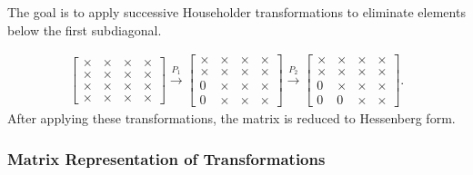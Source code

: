 \documentclass[12pt]{article}
\begin{document}
The goal is to apply successive Householder transformations to eliminate elements below the first subdiagonal.

\begin{align*}
\begin{bmatrix}
\times & \times & \times & \times \\
\times & \times & \times & \times \\
\times & \times & \times & \times \\
\times & \times & \times & \times
\end{bmatrix}
\xrightarrow{P_1}
\begin{bmatrix}
\times & \times & \times & \times \\
\times & \times & \times & \times \\
0 & \times & \times & \times \\
0 & \times & \times & \times
\end{bmatrix}
\xrightarrow{P_2}
\begin{bmatrix}
\times & \times & \times & \times \\
\times & \times & \times & \times \\
0 & \times & \times & \times \\
0 & 0 & \times & \times
\end{bmatrix}.
\end{align*}
After applying these transformations, the matrix is reduced to Hessenberg form.

\subsubsection{Matrix Representation of Transformations}
\end{document}
